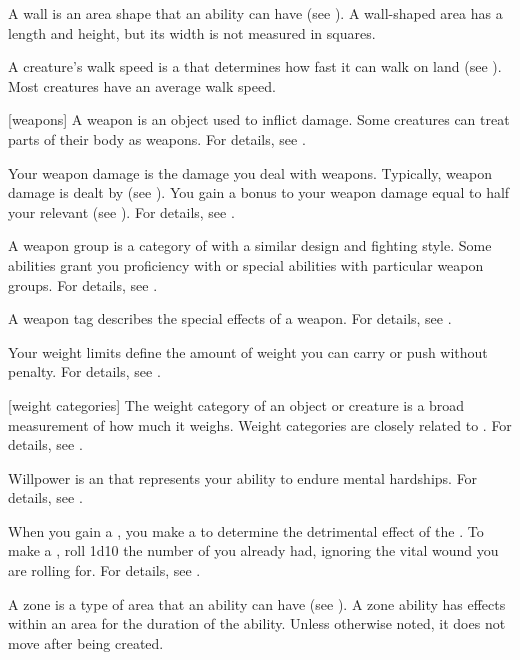 A wall is an area shape that an ability can have (see ).
A wall-shaped area has a length and height, but its width is not measured in squares.

 A creature's walk speed is a  that determines how fast it can walk on land (see ).
Most creatures have an average walk speed.

[weapons] A weapon is an object used to inflict damage.
Some creatures can treat parts of their body as weapons.
For details, see .

 Your weapon damage is the damage you deal with weapons.
Typically, weapon damage is dealt by  (see ).
You gain a bonus to your weapon damage equal to half your relevant  (see ).
For details, see .

 A weapon group is a category of  with a similar design and fighting style.
Some abilities grant you proficiency with or special abilities with particular weapon groups.
For details, see .

 A weapon tag describes the special effects of a weapon.
For details, see .

 Your weight limits define the amount of weight you can carry or push without penalty.
For details, see .

[weight categories] The weight category of an object or creature is a broad measurement of how much it weighs.
Weight categories are closely related to .
For details, see .

 Willpower is an  that represents your ability to endure mental hardships.
For details, see .

 When you gain a , you make a  to determine the detrimental effect of the .
To make a , roll 1d10 \sub the number of  you already had, ignoring the vital wound you are rolling for.
For details, see .

 A zone is a type of area that an ability can have (see ).
A zone ability has effects within an area for the duration of the ability.
Unless otherwise noted, it does not move after being created.
